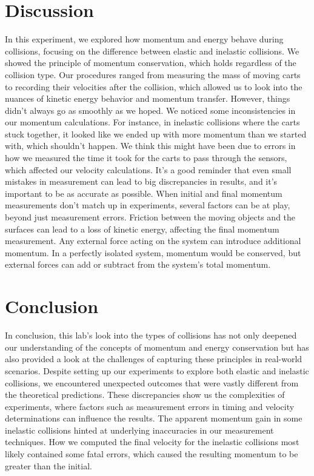 \documentclass{report}
\begin{document}
    \section{Discussion}
    \bigbreak \noindent 
    In this experiment, we explored how momentum and energy behave during collisions, focusing on the difference between elastic and inelastic collisions.  We showed the principle of momentum conservation, which holds regardless of the collision type. Our procedures ranged from measuring the mass of moving carts to recording their velocities after the collision, which allowed us to look into the nuances of kinetic energy behavior and momentum transfer.
    \bigbreak \noindent 
    However, things didn't always go as smoothly as we hoped. We noticed some inconsistencies in our momentum calculations. For instance, in inelastic collisions where the carts stuck together, it looked like we ended up with more momentum than we started with, which shouldn't happen. We think this might have been due to errors in how we measured the time it took for the carts to pass through the sensors, which affected our velocity calculations. It's a good reminder that even small mistakes in measurement can lead to big discrepancies in results, and it's important to be as accurate as possible.
    \bigbreak \noindent 
    When initial and final momentum measurements don't match up in experiments, several factors can be at play, beyond just measurement errors. Friction between the moving objects and the surfaces can lead to a loss of kinetic energy, affecting the final momentum measurement. Any external force acting on the system can introduce additional momentum. In a perfectly isolated system, momentum would be conserved, but external forces can add or subtract from the system's total momentum.




    \bigbreak \noindent 
    \section{Conclusion}
    \bigbreak \noindent 
    In conclusion, this lab's look into the types of collisions has not only deepened our understanding of the concepts of momentum and energy conservation but has also provided a look at the challenges of capturing these principles in real-world scenarios. Despite setting up our experiments to explore both elastic and inelastic collisions, we encountered unexpected outcomes that were vastly different from the theoretical predictions. These discrepancies show us the complexities of experiments, where factors such as measurement errors in timing and velocity determinations can influence the results. The apparent momentum gain in some inelastic collisions hinted at underlying inaccuracies in our measurement techniques. How we computed the final velocity for the inelastic collisions most likely contained some fatal errors, which caused the resulting momentum to be greater than the initial.









    
\end{document}
